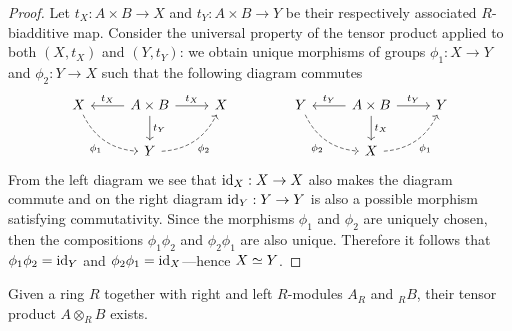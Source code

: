 \begin{proof}
Let \(t_X: A \times B \to X\) and \(t_Y: A \times B \to Y\) be their
respectively associated \(R\)-biadditive map. Consider the universal property of
the tensor product applied to both \((X, t_X)\) and \((Y, t_Y)\): we obtain
unique morphisms of groups \(\phi_1: X \to Y\) and \(\phi_2: Y \to X\) such that
the following diagram commutes
\[
\begin{tikzcd}
X \ar[rd, dashed, bend right, "\phi_1"']
&A \times B \ar[l, "t_X"']
\ar[d, "t_Y"]
\ar[r, "t_X"]
&X
\\
&Y \ar[ru, "\phi_2"', dashed, bend right] &
\end{tikzcd}
\qquad
\qquad
\begin{tikzcd}
Y \ar[rd, dashed, bend right, "\phi_2"']
&A \times B \ar[l, "t_Y"']
\ar[d, "t_X"]
\ar[r, "t_Y"]
&Y
\\
&X \ar[ru, "\phi_1"', dashed, bend right] &
\end{tikzcd}
\]
From the left diagram we see that \(\operatorname{id}_X: X \to X\) also makes the diagram
commute and on the right diagram \(\operatorname{id}_Y: Y \to Y\) is also a possible morphism
satisfying commutativity. Since the morphisms \(\phi_1\) and \(\phi_2\) are
uniquely chosen, then the compositions \(\phi_1 \phi_2\) and \(\phi_2 \phi_1\)
are also unique. Therefore it follows that \(\phi_1 \phi_2 = \operatorname{id}_Y\) and
\(\phi_2 \phi_1 = \operatorname{id}_X\)---hence \(X \simeq Y\).
\end{proof}

\begin{lemma}[Existence]
\label{lem:tensor-product-exists}
Given a ring \(R\) together with right and left \(R\)-modules \(A_R\) and
\({}_RB\), their tensor product \(A \otimes_R B\) exists.
\end{lemma}


